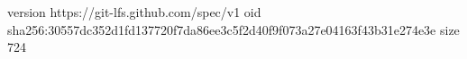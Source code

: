 version https://git-lfs.github.com/spec/v1
oid sha256:30557dc352d1fd137720f7da86ee3c5f2d40f9f073a27e04163f43b31e274e3e
size 724
